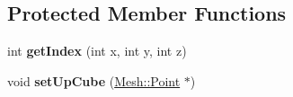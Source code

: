 \subsection*{Protected Member Functions}
\begin{DoxyCompactItemize}
\item 
\hypertarget{class_interpolator3_d_a7e2942f01f608409f4da0f2c40b9099a}{
int {\bfseries getIndex} (int x, int y, int z)}
\label{class_interpolator3_d_a7e2942f01f608409f4da0f2c40b9099a}

\item 
\hypertarget{class_interpolator3_d_a9e5a684fee473ea692100f1aed23dcbe}{
void {\bfseries setUpCube} (\hyperlink{struct_mesh_1_1_point}{Mesh::Point} $\ast$)}
\label{class_interpolator3_d_a9e5a684fee473ea692100f1aed23dcbe}

\end{DoxyCompactItemize}
